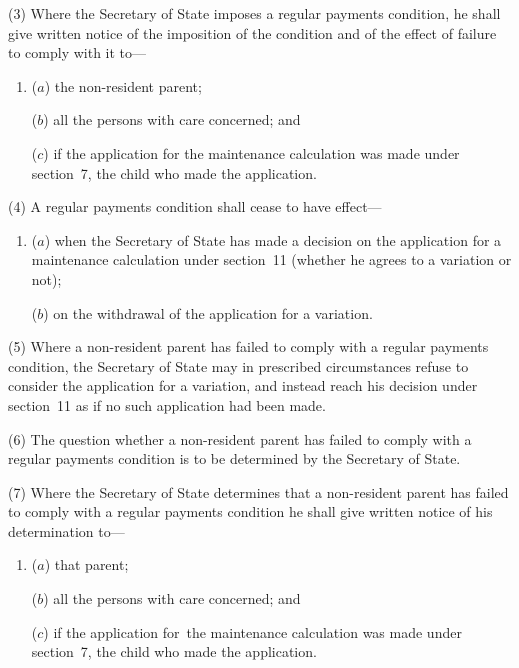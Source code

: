 \documentclass[12pt,a4paper]{article}
\begin{document}
(3) Where the Secretary of State imposes a regular payments condition, he shall give written notice of the imposition of the condition and of the effect of failure to comply with it to—
\begin{enumerate}\item[]
($a$) the non-resident parent;

($b$) all the persons with care concerned; and

($c$) if the application for the maintenance calculation was made under section~7, the child who made the application.
\end{enumerate}

(4) A regular payments condition shall cease to have effect—
\begin{enumerate}\item[]
($a$) when the Secretary of State has made a decision on the application for a maintenance calculation under section~11 (whether he agrees to a variation or not);

($b$) on the withdrawal of the application for a variation.
\end{enumerate}

(5) Where a non-resident parent has failed to comply with a regular payments condition, the Secretary of State may in prescribed circumstances refuse to consider the application for a variation, and instead reach his decision under section~11 as if no such application had been made.

(6) The question whether a non-resident parent has failed to comply with a regular payments condition is to be determined by the Secretary of State.

(7) Where the Secretary of State determines that a non-resident parent has failed to comply with a regular payments condition he shall give written notice of his determination to—
\begin{enumerate}\item[]
($a$) that parent;

($b$) all the persons with care concerned; and

($c$) if the application for~the maintenance calculation was made under section~7, the child who made the application.
\end{enumerate}

\end{document}
